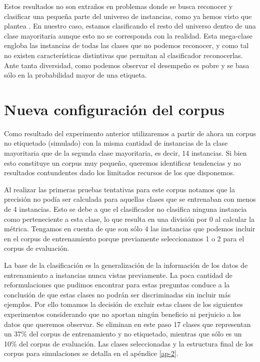 Estos resultados no son extraños en problemas donde se busca reconocer y clasificar una pequeña parte del universo de instancias, como ya hemos visto que plantea \citet{rare-classes-holpedales}. En nuestro caso, estamos clasificando el resto del universo dentro de una clase mayoritaria aunque esto no se corresponda con la realidad. Esta mega-clase engloba las instancias de todas las clases que no podemos reconocer, y como tal no existen características distintivas que permitan al clasificador reconocerlas. Ante tanta diversidad, como podemos observar el desempeño es pobre y se basa sólo en la probabilidad mayor de una etiqueta.


\section{Nueva configuración del corpus}

Como resultado del experimento anterior utilizaremos a partir de ahora un corpus no etiquetado (simulado) con la misma cantidad de instancias de la clase mayoritaria que de la segunda clase mayoritaria, es decir, 14 instancias. Si bien esto constituye un corpus muy pequeño, queremos identificar tendencias y no resultados contundentes dado los limitados recursos de los que disponemos.

Al realizar las primeras pruebas tentativas para este corpus notamos que la precisión no podía ser calculada para aquellas clases que se entrenaban con menos de 4 instancias. Esto se debe a que el clasificador no clasifica ninguna instancia como perteneciente a esta clase, lo que resulta en una división por 0 al calcular la métrica. Tengamos en cuenta de que son sólo 4 las instancias que podemos incluir en el corpus de entrenamiento porque previamente seleccionamos 1 o 2 para el corpus de evaluación.

La base de la clasificación es la generalización de la información de los datos de entrenamiento a instancias nunca vistas previamente. La poca cantidad de reformulaciones que pudimos encontrar para estas preguntas conduce a la conclusión de que estas clases no podrán ser discriminadas sin incluir más ejemplos. Por ello tomamos la decisión de excluir estas clases de los siguientes experimentos considerando que no aportan ningún beneficio ni perjuicio a los datos que queremos observar. Se eliminan en este paso 17 clases que representan un 37\% del corpus de entrenamiento y no etiquetado, mientras que sólo es un 10\% del corpus de evaluación. Las clases seleccionadas y la estructura final de los corpus para simulaciones se detalla en el apéndice \ref{ap-2}.


